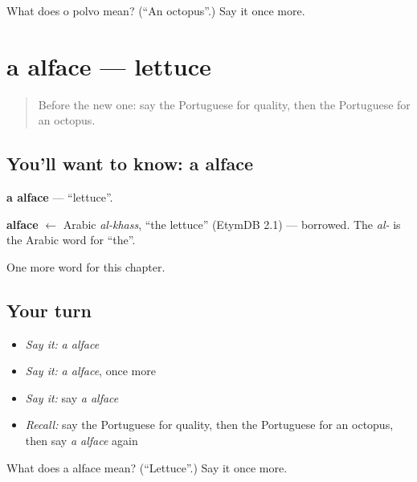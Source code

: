 \begin{tcolorbox}[breakable,colback=teal!4,colframe=teal!35!black,title={Before you move on}]
What does o polvo mean? (\textquotedblleft{}An octopus\textquotedblright{}.) Say it once more.
\end{tcolorbox}
\section[a alface]{a alface — lettuce}

\label{lesson:PT-C168-alface}



\begin{quote}
Before the new one: say the Portuguese for quality, then the Portuguese for an octopus.
\end{quote}

\subsection*{You'll want to know: a alface}
\textbf{a alface} — \textquotedblleft{}lettuce\textquotedblright{}.

\begin{cousinweb}
\textbf{alface} $\leftarrow$ Arabic \emph{al-khass}, \textquotedblleft{}the lettuce\textquotedblright{} (EtymDB 2.1) — borrowed. The \emph{al-} is the Arabic word for \textquotedblleft{}the\textquotedblright{}.
\end{cousinweb}

\begin{grammarlens}[title={What you've built}]
One more word for this chapter.
\end{grammarlens}

\subsection*{Your turn}
\begin{itemize}
\raggedright
  \item \emph{Say it:} \emph{a alface}
  \item \emph{Say it:} \emph{a alface}, once more
  \item \emph{Say it:} say \emph{a alface}
  \item \emph{Recall:} say the Portuguese for quality, then the Portuguese for an octopus, then say \emph{a alface} again
\end{itemize}

\begin{tcolorbox}[breakable,colback=teal!4,colframe=teal!35!black,title={Before you move on}]
What does a alface mean? (\textquotedblleft{}Lettuce\textquotedblright{}.) Say it once more.
\end{tcolorbox}
